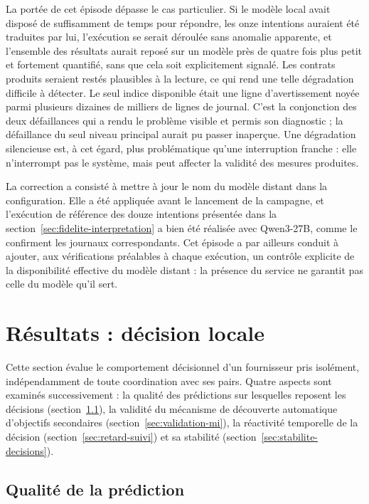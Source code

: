 La portée de cet épisode dépasse le cas particulier. Si le modèle local avait disposé de suffisamment de temps pour répondre, les onze intentions auraient été traduites par lui, l'exécution se serait déroulée sans anomalie apparente, et l'ensemble des résultats aurait reposé sur un modèle près de quatre fois plus petit et fortement quantifié, sans que cela soit explicitement signalé. Les contrats produits seraient restés plausibles à la lecture, ce qui rend une telle dégradation difficile à détecter. Le seul indice disponible était une ligne d'avertissement noyée parmi plusieurs dizaines de milliers de lignes de journal. C'est la conjonction des deux défaillances qui a rendu le problème visible et permis son diagnostic ; la défaillance du seul niveau principal aurait pu passer inaperçue. Une dégradation silencieuse est, à cet égard, plus problématique qu'une interruption franche : elle n'interrompt pas le système, mais peut affecter la validité des mesures produites.

La correction a consisté à mettre à jour le nom du modèle distant dans la configuration. Elle a été appliquée avant le lancement de la campagne, et l'exécution de référence des douze intentions présentée dans la section~\ref{sec:fidelite-interpretation} a bien été réalisée avec Qwen3-27B, comme le confirment les journaux correspondants. Cet épisode a par ailleurs conduit à ajouter, aux vérifications préalables à chaque exécution, un contrôle explicite de la disponibilité effective du modèle distant : la présence du service ne garantit pas celle du modèle qu'il sert.

\newpage
\section{Résultats : décision locale}
\label{sec:resultats-decision-locale}

Cette section évalue le comportement décisionnel d'un fournisseur pris isolément, indépendamment de toute coordination avec ses pairs. Quatre aspects sont examinés successivement : la qualité des prédictions sur lesquelles reposent les décisions (section~\ref{sec:qualite-prediction}), la validité du mécanisme de découverte automatique d'objectifs secondaires (section~\ref{sec:validation-mi}), la réactivité temporelle de la décision (section~\ref{sec:retard-suivi}) et sa stabilité (section~\ref{sec:stabilite-decisions}).

\subsection{Qualité de la prédiction}
\label{sec:qualite-prediction}


